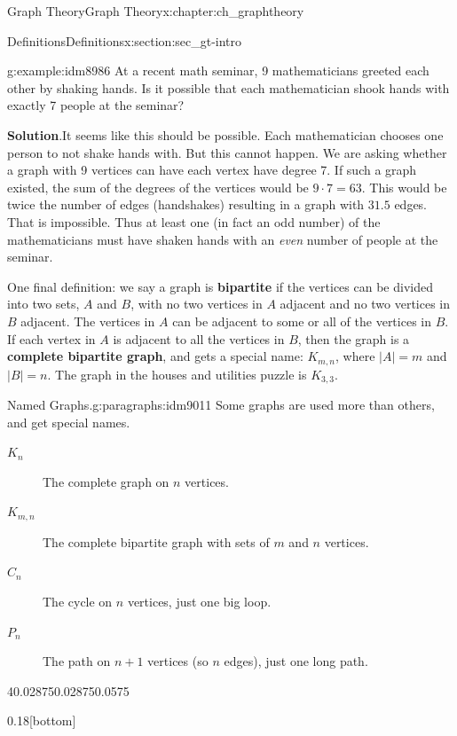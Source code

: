 \documentclass[oneside,10pt,]{book}
\newcommand{\terminology}[1]{\textbf{#1}}
\numberwithin{equation}{chapter}
\begin{document}
\begin{chapterptx}{Graph Theory}{}{Graph Theory}{}{}{x:chapter:ch_graphtheory}
\begin{sectionptx}{Definitions}{}{Definitions}{}{}{x:section:sec_gt-intro}
\begin{example}{}{g:example:idm8986}%
At a recent math seminar, 9 mathematicians greeted each other by shaking hands. Is it possible that each mathematician shook hands with exactly 7 people at the seminar?%
\par\smallskip%
\noindent\textbf{Solution}.\hypertarget{g:solution:idm8989}{}\quad{}It seems like this should be possible. Each mathematician chooses one person to not shake hands with. But this cannot happen. We are asking whether a graph with 9 vertices can have each vertex have degree 7. If such a graph existed, the sum of the degrees of the vertices would be \(9\cdot 7 = 63\). This would be twice the number of edges (handshakes) resulting in a graph with \(31.5\) edges. That is impossible. Thus at least one (in fact an odd number) of the mathematicians must have shaken hands with an \emph{even} number of people at the seminar.%
\end{example}
One final definition: we say a graph is \terminology{bipartite} if the vertices can be divided into two sets, \(A\) and \(B\), with no two vertices in \(A\) adjacent and no two vertices in \(B\) adjacent. The vertices in \(A\) can be adjacent to some or all of the vertices in \(B\). If each vertex in \(A\) is adjacent to all the vertices in \(B\), then the graph is a \terminology{complete bipartite graph}, and gets a special name: \(K_{m,n}\), where \(|A| = m\) and \(|B| = n\). The graph in the houses and utilities puzzle is \(K_{3,3}\).%
\begin{paragraphs}{Named Graphs.}{g:paragraphs:idm9011}%
Some graphs are used more than others, and get special names.%
\begin{description}
\item[{\(K_n\)}]The complete graph on \(n\) vertices.\label{g:notation:idm9020}%
\item[{\(K_{m,n}\)}]The complete bipartite graph with sets of \(m\) and \(n\) vertices. \label{g:notation:idm9030}%
\item[{\(C_n\)}]The cycle on \(n\) vertices, just one big loop. \label{g:notation:idm9040}%
\item[{\(P_n\)}]The path on \(n+1\) vertices (so \(n\) edges), just one long path. \label{g:notation:idm9050}%
\end{description}
%
\begin{sidebyside}{4}{0.02875}{0.02875}{0.0575}%
\begin{sbspanel}{0.18}[bottom]%
\resizebox{\linewidth}{!}{%
				\begin{tikzpicture}[scale=1]

\end{tikzpicture}}
\end{sbspanel}
\end{sidebyside}
\end{paragraphs}
\end{sectionptx}
\end{chapterptx}
\end{document}
